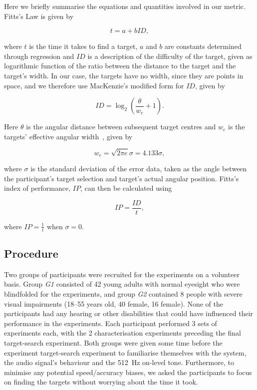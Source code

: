 \documentclass{article}
\begin{document}
Here we briefly summarise the equations and quantities involved in our metric.
Fitts's Law is given by  

\begin{equation}
  \label{eq:fitts-base}
  t = a + bID,
\end{equation}

\noindent
where $t$ is the time it takes to find a target, $a$ and $b$ are constants determined through regression and $ID$ is a description of the difficulty of the target, given as logarithmic function of the ratio between the distance to the target and the target's width.
In our case, the targets have no width, since they are points in space, and we therefore use MacKenzie's modified form for $ID$, given by

\begin{equation}
  \label{eq:fitts-id}
  ID = \log_2\left(\frac{\theta}{w_e} + 1\right).
\end{equation}

\noindent
Here $\theta$ is the angular distance between subsequent target centres and $w_e$ is the targets' effective angular width~\cite{welford1968fundamentals}, given by

\begin{equation}
  \label{eq:fitts-we}
  w_e = \sqrt{2\pi e}\sigma = 4.133\sigma,
\end{equation}

\noindent
where $\sigma$ is the standard deviation of the error data, taken as the angle between the participant's target selection and target's actual angular position.
Fitts's index of performance, $IP$, can then be calculated using 

\begin{equation}
  \label{eq:fitts-performance}
  IP = \frac{ID}{t},
\end{equation}

\noindent
where $IP = \frac{1}{t}$ when $\sigma=0$.

\subsection{Procedure}

Two groups of participants were recruited for the experiments on a volunteer basis. 
Group \textit{G1} consisted of 42 young adults with normal eyesight who were blindfolded for the experiments, and group \textit{G2} contained 8 people with severe visual impairments (18--55 years old, 40 female, 16 female). 
None of the participants had any hearing or other disabilities that could have influenced their performance in the experiments.
Each participant performed 3 sets of experiments each, with the 2 characterisation experiments preceding the final target-search experiment. 
Both groups were given some time before the experiment target-search experiment to familiarise themselves with the system, the audio signal's behaviour and the \SI{512}{\hertz} on-level tone. 
Furthermore, to minimise any potential speed/accuracy biases, we asked the participants to focus on finding the targets without worrying about the time it took. 
\end{document}
